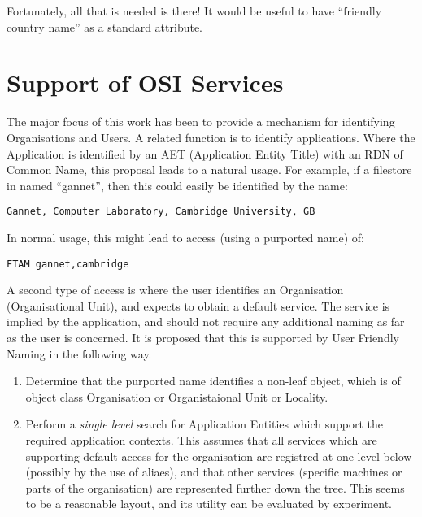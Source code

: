 Fortunately, all that is needed is there!  It would be useful to have
``friendly country name'' as a standard attribute.


\section{Support of OSI Services}

The major focus of this work has been to provide a mechanism for identifying
Organisations and Users.   A related function is to identify applications.
Where the Application is identified by an AET (Application Entity Title)
with an RDN of Common Name, this proposal leads to a natural usage.
For example, if a filestore in named ``gannet'', then this could easily be
identified by the name:

\begin{verbatim}
Gannet, Computer Laboratory, Cambridge University, GB   
\end{verbatim}

In normal usage, this might lead to access (using a purported name) of:

\begin{verbatim}
FTAM gannet,cambridge
\end{verbatim}

A second type of access is where the user identifies an Organisation
(Organisational Unit), and expects to obtain a default service.   
The service is implied by the application, and should not require any
additional naming as far as the user is concerned.  It is proposed that this
is supported by User Friendly Naming in the following way.  

\begin{enumerate}
\item Determine that the purported name identifies a non-leaf object, which is
of object class Organisation or Organistaional Unit or Locality.

\item Perform a {\em single level} search for Application Entities which
support the required application contexts.  This assumes that all services
which are supporting default access for the organisation are registred at
one level below (possibly by the use of aliaes), and that other services
(specific machines or parts of the organisation) are represented further
down the tree.  This seems to be a reasonable layout, and its utility can be
evaluated by experiment.

\end{enumerate}

